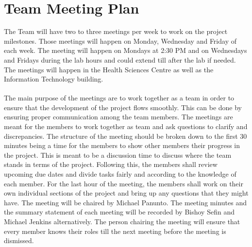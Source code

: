 \documentclass[a4paper]{article}
\begin{document}
\newpage

\section{Team Meeting Plan}
    \label{sec:MeetingPlan}
    The Team will have two to three meetings per week to work on the project milestones. Those meetings will happen on Monday, Wednesday and Friday of each week. The meeting will happen on Mondays at 2:30 PM and on Wednesdays and Fridays during the lab hours and could extend till after the lab if needed. The meetings will happen in the Health Sciences Centre as well as the Information Technology building. \\ \\
    
    The main purpose of the meetings are to work together as a team in order to ensure that the development of the project flows smoothly. This can be done by ensuring proper communication among the team members. The meetings are meant for the members to work together as team and ask questions to clarify and discrepancies. The structure of the meeting should be broken down to the first 30 minutes being a time for the members to show other members their progress in the project. This is meant to be a discussion time to discuss where the team stands in terms of the project. Following this, the members shall review upcoming due dates and divide tasks fairly and according to the knowledge of each member. For the last hour of the meeting, the members shall work on their own individual sections of the project and bring up any questions that they might have. The meeting will be chaired by Michael Panunto. The meeting minutes and the summary statement of each meeting will be recorded by Bishoy Sefin and Michael Jenkins alternatively. The person chairing the meeting will ensure that every member knows their roles till the next meeting before the meeting is dismissed. 
\end{document}
